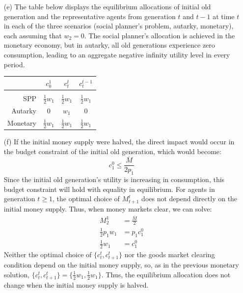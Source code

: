 \documentclass{article}
\begin{document}
\begin{itemize}
	\item[(e)] The table below displays the equilibrium allocations of initial old generation and the representative agents from generation $t$ and $t-1$ at time $t$ in each of the three scenarios (social planner's problem, autarky, monetary), each assuming that $w_2 = 0$. The social planner's allocation is achieved in the monetary economy, but in autarky, all old generations experience zero consumption, leading to an aggregate negative infinity utility level in every period.
		\begin{center}
			\begin{tabular}{r|c c c}
							& $c_0^1$			& $c_t^t$ 			& $c_t^{t-1}$			\\
				\hline		&					&					&						\\
				SPP			& $\frac{1}{2}w_1$	& $\frac{1}{2}w_1$	& $\frac{1}{2}w_1$		\\
				Autarky 	& 0					& $w_1$				& 0						\\
				Monetary	& $\frac{1}{2}w_1$	& $\frac{1}{2}w_1$	& $\frac{1}{2}w_1$
			\end{tabular}
		\end{center}
		
	\item[(f)] If the initial money supply were halved, the direct impact would occur in the budget constraint of the initial old generation, which would become:
		\[
			c_1^0 \leq \frac{\overline{M}}{2p_1}
		\]
		Since the initial old generation's utility is increasing in consumption, this budget constraint will hold with equality in equilibrium. For agents in generation $t\geq 1$, the optimal choice of $M_{t+1}^t$ does not depend directly on the initial money supply. Thus, when money markets clear, we can solve:
		\begin{align*}
			M_2^1 				&= \frac{\overline{M}}{2}	\\
			\frac{1}{2}p_1w_1 	&= p_1c^0_1					\\
			\frac{1}{2}w_1 		&= c^0_1
		\end{align*}
		Neither the optimal choice of $\{c_t^t,c_{t+1}^t\}$ nor the goods market clearing condition depend on the initial money supply, so, as in the previous monetary solution, $\{c_t^t,c_{t+1}^t\}=\{\frac{1}{2}w_1,\frac{1}{2}w_1\}$. Thus, the equilibrium allocation does not change when the initial money supply is halved.
		
\end{itemize}


\end{document}
